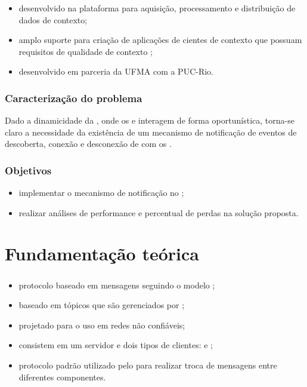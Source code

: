 \documentclass[aspectratio=169]{beamer}
\begin{document}
\begin{frame}
	\frametitle{\mhubcddl}
	\begin{itemize}
		\item \middleware \iomt desenvolvido na plataforma \android para aquisição, processamento e distribuição de dados de contexto;
			
		\item amplo suporte para criação de aplicações de \iot cientes de contexto que possuam requisitos de qualidade de contexto \cite{gomes:et-al:2017};

		\item desenvolvido em parceria da UFMA com a PUC-Rio.
	\end{itemize}
\end{frame}

\begin{frame}
	\frametitle{Caracterização do problema}
	Dado a dinamicidade da \iomt, onde os \smartobjs e \gateways interagem de forma oportunística, torna-se claro a necessidade da existência de um mecanismo de notificação de eventos de descoberta, conexão e desconexão de \smartobjs com os \smartphones.
\end{frame}

\begin{frame}
	\frametitle{Objetivos}
	\begin{itemize}
		\item implementar o mecanismo de notificação no \middleware \mhubcddl;

		\item realizar análises de performance e percentual de perdas na solução proposta.
	\end{itemize}
		
	
\end{frame}


\section{Fundamentação teórica}


\begin{frame}
	\frametitle{\mqtt}
	\begin{itemize}
		\item protocolo baseado em mensagens seguindo o modelo \pubsub;

		\item baseado em tópicos que são gerenciados por \brokers;

		\item projetado para o uso em redes não confiáveis;

		\item consistem em um servidor \broker e dois tipos de clientes: \pubs e \subs;
			
		\item protocolo padrão utilizado pelo \cddl para realizar troca de mensagens entre diferentes componentes.
	\end{itemize}
\end{frame}
\end{document}
